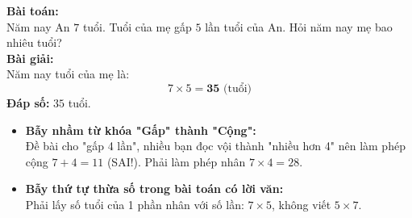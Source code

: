 \documentclass[12pt,a4paper]{article}
\begin{document}
\vspace{-2.5mm}
\noindent
\begin{minipage}[t]{0.49\textwidth}\vspace{0pt}
\begin{tcolorbox}[
  enhanced,
  colback=green!4!white,
  colframe=green!60!black,
  arc=2mm, boxrule=0.8pt,
  left=2mm, right=2mm, top=1.8mm, bottom=1.8mm,
  title={\footnotesize\bfseries\color{white}\faCheckCircle\ Ví dụ thực hành chuẩn mực}
]
{\footnotesize
\textbf{Bài toán:}\\
Năm nay An $7$ tuổi. Tuổi của mẹ gấp $5$ lần tuổi của An. Hỏi năm nay mẹ bao nhiêu tuổi?\\
\textbf{Bài giải:}\\
Năm nay tuổi của mẹ là:
$$7 \times 5 = \mathbf{35}\text{ (tuổi)}$$
\textbf{Đáp số:} $35$ tuổi.
}
\end{tcolorbox}
\end{minipage}
\hfill
\begin{minipage}[t]{0.49\textwidth}\vspace{0pt}
\begin{tcolorbox}[
  enhanced,
  colback=red!4!white,
  colframe=red!70!black,
  arc=2mm, boxrule=0.8pt,
  left=2mm, right=2mm, top=1.8mm, bottom=1.8mm,
  title={\footnotesize\bfseries\color{white}\faExclamationTriangle\ Mẹo tránh bẫy trắc nghiệm}
]
{\footnotesize
\begin{itemize}\setlength{\itemsep}{1.5pt}\setlength{\leftskip}{-2.5mm}
  \item \textbf{Bẫy nhầm từ khóa "Gấp" thành "Cộng":}\\
  Đề bài cho "gấp 4 lần", nhiều bạn đọc vội thành "nhiều hơn 4" nên làm phép cộng $7 + 4 = 11$ (SAI!). Phải làm phép nhân $7 \times 4 = 28$.
  \item \textbf{Bẫy thứ tự thừa số trong bài toán có lời văn:}\\
  Phải lấy số tuổi của 1 phần nhân với số lần: $7 \times 5$, không viết $5 \times 7$.
\end{itemize}
}
\end{tcolorbox}
\end{minipage}
\end{document}
